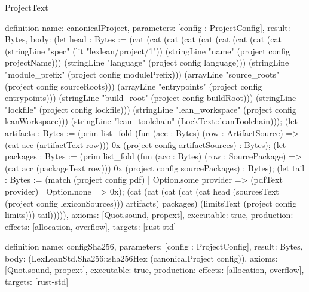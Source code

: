 \begin{lexlean}{ProjectText}
\begin{semanticmodule}
definition{
  name: canonicalProject,
  parameters: [config : ProjectConfig],
  result: Bytes,
  body: (let head : Bytes := (cat (cat (cat (cat (cat (cat (cat (cat (cat (stringLine "spec" (lit "lexlean/project/1")) (stringLine "name" (project config projectName))) (stringLine "language" (project config language))) (stringLine "module_prefix" (project config modulePrefix))) (arrayLine "source_roots" (project config sourceRoots))) (arrayLine "entrypoints" (project config entrypoints))) (stringLine "build_root" (project config buildRoot))) (stringLine "lockfile" (project config lockfile))) (stringLine "lean_workspace" (project config leanWorkspace))) (stringLine "lean_toolchain" (LockText::leanToolchain))); (let artifacts : Bytes := (prim list_fold (fun (acc : Bytes) (row : ArtifactSource) => (cat acc (artifactText row))) 0x (project config artifactSources) : Bytes); (let packages : Bytes := (prim list_fold (fun (acc : Bytes) (row : SourcePackage) => (cat acc (packageText row))) 0x (project config sourcePackages) : Bytes); (let tail : Bytes := (match (project config pdf)
    | Option.some provider => (pdfText provider)
    | Option.none => 0x); (cat (cat (cat (cat (cat head (sourcesText (project config lexiconSources))) artifacts) packages) (limitsText (project config limits))) tail))))),
  axioms: [Quot.sound, propext],
  executable: true,
  production: {effects: [allocation, overflow], targets: [rust-std]}
}

definition{
  name: configSha256,
  parameters: [config : ProjectConfig],
  result: Bytes,
  body: (LexLeanStd.Sha256::sha256Hex (canonicalProject config)),
  axioms: [Quot.sound, propext],
  executable: true,
  production: {effects: [allocation, overflow], targets: [rust-std]}
}
\end{semanticmodule}
\end{lexlean}
